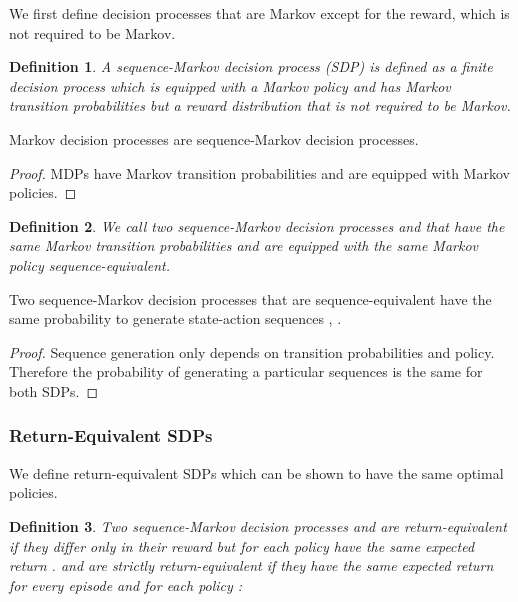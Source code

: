 \documentclass{article}
\newtheorem{definitionA}{Definition}
\begin{document}
\begin{appendices}
We first define decision processes that
are Markov except for the reward, which is not required to be Markov.
\begin{definitionA}
  \label{def:Asdp}
A sequence-Markov decision process (SDP) is defined as a finite decision process which is equipped with 
a Markov policy and has Markov transition probabilities 
but a reward distribution that is not required to be Markov.
\end{definitionA}

\begin{propositionA}
\label{th:AsdpMDP}
  Markov decision processes are sequence-Markov decision processes.
\end{propositionA}
\begin{proof}
MDPs have Markov transition probabilities
and are equipped with Markov policies.
\end{proof}



\begin{definitionA}
  \label{def:AseqEqi}
We call two sequence-Markov decision processes  and   
that have the same Markov transition probabilities
and are equipped with the same Markov policy {\em sequence-equivalent}.
\end{definitionA}



\begin{lemmaA}
\label{th:AsdpSeq}
Two sequence-Markov decision processes that are 
sequence-equivalent have the same probability to generate 
state-action sequences , . 
\end{lemmaA}
\begin{proof}
Sequence generation only depends on transition probabilities
and policy. Therefore the probability of generating a particular
sequences is the same for both SDPs.
\end{proof}

\subsubsection{Return-Equivalent SDPs}
\label{sec:AEquiSDPs}

We define return-equivalent SDPs which can be shown to
have the same optimal policies.
\begin{definitionA}
  \label{def:AreturnEqSDP}
  Two sequence-Markov decision processes  and 
  are {\em return-equivalent} if
  they differ only in their reward but
  for each policy  have the same expected return
  .
   and  
  are {\em strictly return-equivalent} if
  they have the same expected return for every episode and
  for each policy :
  

\end{definitionA}
\end{appendices}
\end{document}
